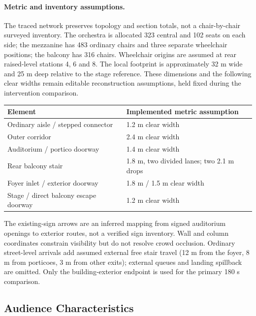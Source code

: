 \documentclass[11pt,a4paper]{article}
\begin{document}
\paragraph{Metric and inventory assumptions.}
The traced network preserves topology and section totals, not a chair-by-chair surveyed inventory. The orchestra is allocated 323 central and 102 seats on each side; the mezzanine has 483 ordinary chairs and three separate wheelchair positions; the balcony has 316 chairs. Wheelchair origins are assumed at rear raised-level stations 4, 6 and 8. The local footprint is approximately 32 m wide and 25 m deep relative to the stage reference. These dimensions and the following clear widths remain editable reconstruction assumptions, held fixed during the intervention comparison.
\begin{center}\small
\begin{tabular}{ll}\toprule
Element & Implemented metric assumption\\\midrule
Ordinary aisle / stepped connector & 1.2 m clear width\\
Outer corridor & 2.4 m clear width\\
Auditorium / portico doorway & 1.4 m clear width\\
Rear balcony stair & 1.8 m, two divided lanes; two 2.1 m drops\\
Foyer inlet / exterior doorway & 1.8 m / 1.5 m clear width\\
Stage / direct balcony escape doorway & 1.2 m clear width\\\bottomrule
\end{tabular}
\end{center}
The existing-sign arrows are an inferred mapping from signed auditorium openings to exterior routes, not a verified sign inventory. Wall and column coordinates constrain visibility but do not resolve crowd occlusion. Ordinary street-level arrivals add assumed external free stair travel (12 m from the foyer, 8 m from porticoes, 3 m from other exits); external queues and landing spillback are omitted. Only the building-exterior endpoint is used for the primary 180 s comparison.

\subsection{Audience Characteristics}
\end{document}
